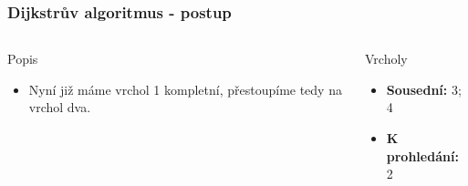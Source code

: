 \documentclass{beamer}
\begin{document}
\begin{frame}
    \frametitle{Dijkstrův algoritmus - postup}
    \begin{columns}
        \begin{block}{Popis}
            \begin{itemize}
                \item Nyní již máme vrchol 1 kompletní, přestoupíme tedy na vrchol dva.
            \end{itemize}
        \end{block}
        \begin{block}{Vrcholy}
            \begin{itemize}
                \item \textbf{Sousední:} 3; 4 
                \item \textbf{K prohledání:} 2
            \end{itemize}
        \end{block}
    \end{columns}
\end{frame}
\end{document}
